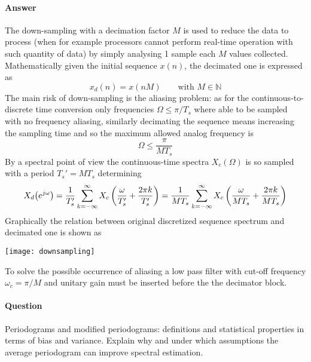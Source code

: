 	\paragraph{Answer} The down-sampling with a decimation factor $M$ is used to reduce the data to process (when for example processors cannot perform real-time operation with such quantity of data) by simply analysing 1 sample each $M$ values collected. Mathematically given the initial sequence $x(n)$, the decimated one is expressed as
	\[ x_d(n) = x(nM) \qquad \textrm{with } M \in \mathds N \]
	The main risk of down-sampling is the aliasing problem: as for the continuous-to-discrete time conversion only frequencies $\Omega \leq \pi / T_s$ where able to be sampled with no frequency aliasing, similarly decimating the sequence means increasing the sampling time and so the maximum allowed analog frequency is
	\[ \Omega \leq \frac{\pi}{MT_s} \]
	By a spectral point of view the continuous-time spectra $X_c(\Omega)$ is so sampled with a period $T_s' = MT_s$ determining 
	\[ X_d\big(e^{j\omega}\big) = \frac 1{T_s'} \sum_{k=-\infty}^\infty X_c\left( \frac{\omega}{T_s'} + \frac{2\pi k}{T_s'} \right) = \frac 1{MT_s} \sum_{k=-\infty}^\infty X_c\left( \frac{\omega}{MT_s} + \frac{2\pi k}{MT_s} \right)\]
	Graphically the relation between original discretized sequence spectrum and decimated one is shown as
	\begin{center}
		\texttt{[image: downsampling]}
	\end{center}

	To solve the possible occurrence of aliasing a low pass filter with cut-off frequency $\omega_c = \pi/M$ and unitary gain must be inserted before the the decimator block.
	
\newquestion
	\paragraph{Question} Periodograms and modified periodograms: definitions and statistical properties in terms of bias and	variance. Explain why and under which assumptions the average periodogram can improve spectral	estimation.
	
